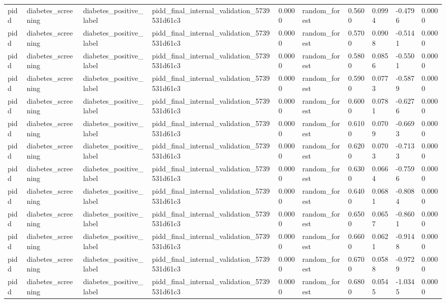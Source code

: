 \begin{tabular}{llllllllll}
pidd & diabetes\_screening & diabetes\_positive\_label & pidd\_final\_internal\_validation\_5739531d61c3 & 0.0000 & random\_forest & 0.5600 & 0.0994 & -0.4796 & 0.0000 \\
pidd & diabetes\_screening & diabetes\_positive\_label & pidd\_final\_internal\_validation\_5739531d61c3 & 0.0000 & random\_forest & 0.5700 & 0.0908 & -0.5141 & 0.0000 \\
pidd & diabetes\_screening & diabetes\_positive\_label & pidd\_final\_internal\_validation\_5739531d61c3 & 0.0000 & random\_forest & 0.5800 & 0.0856 & -0.5501 & 0.0000 \\
pidd & diabetes\_screening & diabetes\_positive\_label & pidd\_final\_internal\_validation\_5739531d61c3 & 0.0000 & random\_forest & 0.5900 & 0.0773 & -0.5879 & 0.0000 \\
pidd & diabetes\_screening & diabetes\_positive\_label & pidd\_final\_internal\_validation\_5739531d61c3 & 0.0000 & random\_forest & 0.6000 & 0.0781 & -0.6276 & 0.0000 \\
pidd & diabetes\_screening & diabetes\_positive\_label & pidd\_final\_internal\_validation\_5739531d61c3 & 0.0000 & random\_forest & 0.6100 & 0.0709 & -0.6693 & 0.0000 \\
pidd & diabetes\_screening & diabetes\_positive\_label & pidd\_final\_internal\_validation\_5739531d61c3 & 0.0000 & random\_forest & 0.6200 & 0.0703 & -0.7133 & 0.0000 \\
pidd & diabetes\_screening & diabetes\_positive\_label & pidd\_final\_internal\_validation\_5739531d61c3 & 0.0000 & random\_forest & 0.6300 & 0.0664 & -0.7596 & 0.0000 \\
pidd & diabetes\_screening & diabetes\_positive\_label & pidd\_final\_internal\_validation\_5739531d61c3 & 0.0000 & random\_forest & 0.6400 & 0.0681 & -0.8084 & 0.0000 \\
pidd & diabetes\_screening & diabetes\_positive\_label & pidd\_final\_internal\_validation\_5739531d61c3 & 0.0000 & random\_forest & 0.6500 & 0.0657 & -0.8601 & 0.0000 \\
pidd & diabetes\_screening & diabetes\_positive\_label & pidd\_final\_internal\_validation\_5739531d61c3 & 0.0000 & random\_forest & 0.6600 & 0.0621 & -0.9148 & 0.0000 \\
pidd & diabetes\_screening & diabetes\_positive\_label & pidd\_final\_internal\_validation\_5739531d61c3 & 0.0000 & random\_forest & 0.6700 & 0.0588 & -0.9729 & 0.0000 \\
pidd & diabetes\_screening & diabetes\_positive\_label & pidd\_final\_internal\_validation\_5739531d61c3 & 0.0000 & random\_forest & 0.6800 & 0.0545 & -1.0345 & 0.0000 \\

\end{tabular}

